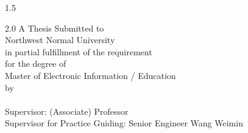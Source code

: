 {\begin{titlepage}
\begin{center}
\begin{spacing}{1.5}
      \end{spacing}

      \begin{spacing}{2.0}
        \vspace*{1.85\baselineskip}
        \sihao
        A Thesis Submitted to\\
        Northwest Normal University\\
        in partial fulfillment of the requirement\\
        for the degree of\\
        Master of Electronic Information / Education\\
        by\\
        \@ename \\
        Supervisor: (Associate) Professor \@esupervisor\\
        Supervisor for Practice Guiding: Senior Engineer Wang Weimin

        \vspace*{3\baselineskip}
        \sanhao\@edate

      \end{spacing}
    \end{center}

  \end{titlepage}

  \clearpage
  \thispagestyle{empty}
  \begin{center}\hei\xiaoer{\@gongjuren}
  \end{center}\par
  \vspace{2.8\baselineskip}

  \begin{center}\hei\xiaoer{\@authorizationtitle}
  \end{center}\par
  \vspace{1.8\baselineskip}

  {
    \linespread{2.0}
    \song\sihao{\@authorizationcontent}\par
  }
  \vspace{2.55\baselineskip}
  \begin{flushright}
    {
      \song\sihao
      \@ownersigncap \makebox[3.5cm][s]{}\par  %
      \vspace{0.6\baselineskip}
      \@supervisorsigncap \makebox[3.5cm][s]{}\par
      \vspace{0.6\baselineskip}
      \@signdatecap\makebox[1.5cm][s]{}

}
\end{flushright}}
